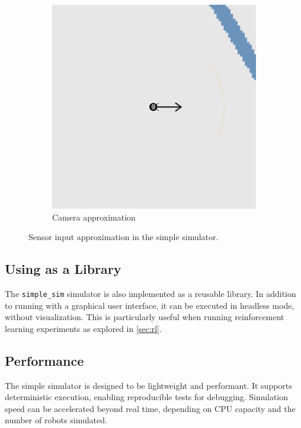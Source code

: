 \begin{figure}
\begin{subfigure}[b]{0.45\textwidth}
        \includegraphics[width=\textwidth]{figures/screenshots/simple-camera.png}
        \caption{Camera approximation}
        \label{fig:camera-approximation}
    \end{subfigure}
    \caption{Sensor input approximation in the simple simulator.}
    \label{fig:sensor-approximation}
\end{figure}

\subsection{Using as a Library}
The \texttt{simple\_sim} simulator is also implemented as a reusable library. In addition to running with a graphical user interface, it can be executed in headless mode, without visualization. This is particularly useful when running reinforcement learning experiments as explored in \cref{sec:rl}.


\subsection{Performance} 
The simple simulator is designed to be lightweight and performant. It supports deterministic execution, enabling reproducible tests for debugging. Simulation speed can be accelerated beyond real time, depending on CPU capacity and the number of robots simulated. \\

